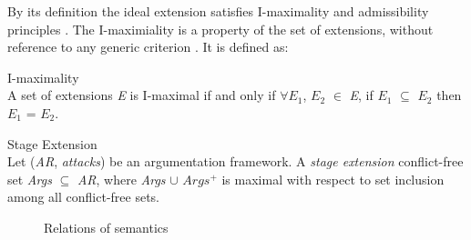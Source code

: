 By its definition the ideal extension satisfies I-maximality and admissibility principles \citep{baroni2009semantics}. The I-maximiality is a property of the set of extensions, without reference to any generic criterion \citep{dunne2006computational}. It is defined as:

\begin{definition}{I-maximality}
\label{def:IMaximality}\\
A set of extensions \textit{E} is I-maximal if and only if $\forall$\textit{$E_1$}, \textit{$E_2$} $\in$ \textit{E}, if \textit{$E_1$} $\subseteq$ \textit{$E_2$} then \textit{$E_1$} = \textit{$E_2$}.
\end{definition}

\begin{definition}{Stage Extension}
\label{def:stageExtension}\\
Let (\textit{AR}, \textit{attacks}) be an argumentation framework. A \textit{stage extension} conflict-free set \textit{Args} $\subseteq$ \textit{AR}, where \textit{Args} $\cup$ \textit{$Args^+$} is maximal with respect to set inclusion among all conflict-free sets.
\end{definition}


\begin{figure}[h]
\centering
{}
\caption{Relations of semantics}
\label{fig:semanticsRelations}
\end{figure}

